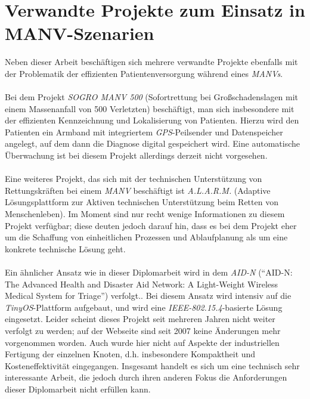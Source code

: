\section{Verwandte Projekte zum Einsatz in MANV-Szenarien}\label{verwandte_projekte}
Neben dieser Arbeit beschäftigen sich mehrere verwandte Projekte ebenfalls mit der Problematik
der effizienten Patientenversorgung während eines \emph{MANVs}.\\
\\
Bei dem Projekt \emph{SOGRO MANV 500} (Sofortrettung bei Großschadenslagen mit einem Massenanfall von 500 Verletzten)
beschäftigt, man sich insbesondere mit der effizienten
Kennzeichnung und Lokalisierung von Patienten. Hierzu wird den Patienten ein Armband mit integriertem \emph{GPS}-Peilsender 
und Datenspeicher angelegt, auf dem dann die Diagnose digital gespeichert wird. Eine automatische Überwachung ist bei
diesem Projekt allerdings derzeit nicht vorgesehen.\cite{sogro}\\
\\            
Eine weiteres Projekt, das sich mit der technischen Unterstützung von Rettungskräften bei einem \emph{MANV}
beschäftigt ist \emph{A.L.A.R.M.} (Adaptive Lösungsplattform zur Aktiven technischen Unterstützung beim Retten von 
Menschenleben). Im Moment sind nur recht wenige Informationen zu diesem Projekt verfügbar; diese
deuten jedoch darauf hin, dass es bei dem Projekt eher um die Schaffung von einheitlichen Prozessen und Ablaufplanung als um eine
konkrete technische Lösung geht.\cite{alarm}\\
\\
Ein ähnlicher Ansatz wie in dieser Diplomarbeit wird in dem \emph{AID-N} ("`AID-N: The Advanced Health and Disaster 
Aid Network: A Light-Weight Wireless Medical System for Triage"') verfolgt.\cite{aid-n}. Bei diesem Ansatz wird 
intensiv auf die \emph{TinyOS}-Plattform aufgebaut, und wird eine \emph{IEEE-802.15.4}-basierte Lösung eingesetzt. 
Leider scheint dieses Projekt seit mehreren Jahren nicht weiter verfolgt zu werden; auf der Webseite sind seit 2007 keine Änderungen 
mehr vorgenommen worden. Auch wurde hier nicht auf Aspekte der industriellen Fertigung der einzelnen Knoten, d.h. 
insbesondere Kompaktheit und Kosteneffektivität eingegangen. Insgesamt handelt es sich um eine technisch sehr 
interessante Arbeit, die jedoch durch ihren anderen Fokus die Anforderungen dieser Diplomarbeit nicht erfüllen kann.
